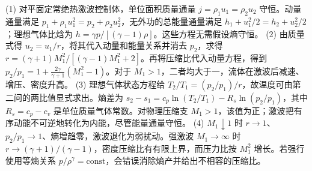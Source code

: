 (1) 对平面定常绝热激波控制体，单位面积质量通量 \(j=\rho_1u_1=\rho_2u_2\) 守恒。动量通量满足 \(p_1+\rho_1u_1^2=p_2+\rho_2u_2^2\)，无外功的总能量通量满足 \(h_1+u_1^2/2=h_2+u_2^2/2\)；理想气体比焓为 \(h=\gamma p/[(\gamma-1)\rho]\)。这些方程无需假设熵守恒。
(2) 由质量式得 \(u_2=u_1/r\)，将其代入动量和能量关系并消去 \(p_2\)，求得 \(r=(\gamma+1)M_1^2/[(\gamma-1)M_1^2+2]\)。再将压缩比代入动量方程，得到 \(p_2/p_1=1+\frac{2\gamma}{\gamma+1}(M_1^2-1)\)。对于 \(M_1>1\)，二者均大于一，流体在激波后减速、增压、密度升高。
(3) 理想气体状态方程给 \(T_2/T_1=(p_2/p_1)/r\)，故温度可由第二问的两比值显式求出。熵差为 \(s_2-s_1=c_p\ln(T_2/T_1)-R_s\ln(p_2/p_1)\)，其中 \(R_s=c_p-c_v\) 是单位质量气体常数。对物理压缩支 \(M_1>1\)，该值为正；激波把有序动能不可逆地转化为内能，尽管能量通量守恒。
(4) \(M_1\downarrow1\) 时 \(r\to1\)、\(p_2/p_1\to1\)、熵增趋零，激波退化为弱扰动。强激波 \(M_1\to\infty\) 时 \(r\to(\gamma+1)/(\gamma-1)\)，密度压缩比有有限上界，而压力比按 \(M_1^2\) 增长。若强行使用等熵关系 \(p/\rho^\gamma=\mathrm{const}\)，会错误消除熵产并给出不相容的压缩比。
